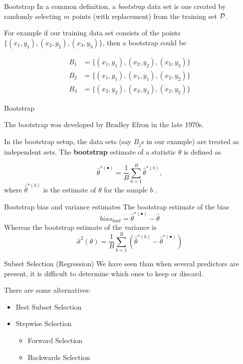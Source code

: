 \documentclass{beamer}
\begin{document}
\begin{frame}{Bootstrap}
	In a common definition, a {\it bootstrap} data set is one created by randomly selecting $m$ points (with replacement) from the training set $\cal{D}$.
	
	For example if our training data set consists of the points $\{(x_1,y_1),(x_2,y_2),(x_3,y_3)\}$, then a bootstrap could be 
	
	\begin{equation*}
		\begin{split}
				B_1&=\{(x_1,y_1),(x_2,y_2),(x_3,y_3)\}\\
				B_2&=\{(x_1,y_1),(x_1,y_1),(x_2,y_2)\} \\
				B_3&=\{(x_2,y_2),(x_3,y_3),(x_2,y_2)\} 
		\end{split}
	\end{equation*}
	 
\end{frame}		

\begin{frame}{Bootstrap}
	
	The bootstrap was developed by Bradley Efron in the late 1970s. 
	
	In the bootstrap setup, the data sets (say $B_j$s in our example) are treated as independent sets. The {\bf bootstrap} estimate of a statistic $\theta$ is defined as
	
	\begin{equation*}
		\hat{\theta}^{*(\bullet)}= \frac{1}{B} \sum_{b=1}^B \hat{\theta}^{*(b)},
	\end{equation*}
where $\hat{\theta}^{*(b)}$ is the estimate of $\theta$ for the sample $b$ .
\end{frame}		

\begin{frame}{Bootstrap bias and variance estimates}
	The bootstrap estimate of the bias 
	\begin{equation*}
		bias_{boot}= \hat{\theta}^{*(\bullet)}- \hat{\theta}
	\end{equation*}
	Whereas the bootstrap estimate of the variance is
	\begin{equation*}
		\hat{\sigma}^2 (\theta)= \frac{1}{B}\sum_{b=1}^B \left(  \hat{\theta}^{*(b)} - \hat{\theta}^{*(\bullet)} 
		\right)
	\end{equation*}
\end{frame}

\begin{frame}{Subset Selection (Regression)}
	We have seen than when several predictors are present, it is difficult to determine which ones to keep or discard. 
	
	There are some alternatives:
	\begin{itemize}
		\item Best Subset Selection
		\item Stepwise Selection
		\begin{itemize}
			\item Forward Selection
			\item Backwards Selection
		\end{itemize}
	\end{itemize}
\end{frame}
\end{document}

